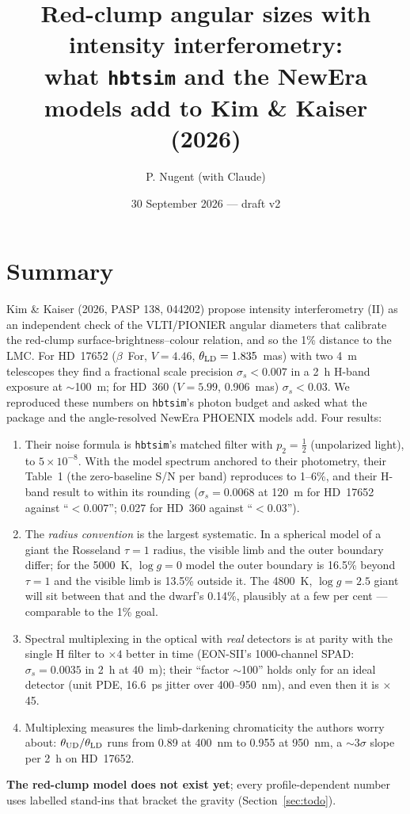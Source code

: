 \documentclass[11pt]{article}
\title{Red-clump angular sizes with intensity interferometry:\\
what \texttt{hbtsim} and the NewEra models add to Kim \& Kaiser (2026)}
\author{P. Nugent (with Claude)}
\date{30 September 2026 --- draft v2}
\begin{document}
\maketitle

\section*{Summary}

Kim \& Kaiser (2026, PASP 138, 044202) propose intensity interferometry
(II) as an independent check of the VLTI/PIONIER angular diameters that
calibrate the red-clump surface-brightness--colour relation, and so
the 1\% distance to the LMC. For HD~17652 ($\beta$~For, $V = 4.46$,
$\theta_{\rm LD} = 1.835$~mas) with two 4~m telescopes they find a
fractional scale precision $\sigma_s < 0.007$ in a 2~h H-band exposure
at $\sim$100~m; for HD~360 ($V = 5.99$, 0.906~mas) $\sigma_s < 0.03$.
We reproduced these numbers on \texttt{hbtsim}'s photon budget and
asked what the package and the angle-resolved NewEra PHOENIX models add.
Four results:
\begin{enumerate}
\item Their noise formula is \texttt{hbtsim}'s matched filter with
  $p_2 = \tfrac12$ (unpolarized light), to $5\times10^{-8}$. With the
  model spectrum anchored to their photometry, their Table~1 (the
  zero-baseline S/N per band) reproduces to 1--6\%, and their H-band
  result to within its rounding ($\sigma_s = 0.0068$ at 120~m for
  HD~17652 against ``$< 0.007$''; 0.027 for HD~360 against ``$< 0.03$'').
\item The \emph{radius convention} is the largest systematic. In a
  spherical model of a giant the Rosseland $\tau = 1$ radius, the
  visible limb and the outer boundary differ; for the 5000~K, $\log g
  = 0$ model the outer boundary is 16.5\% beyond $\tau = 1$ and the
  visible limb is 13.5\% outside it. The 4800~K, $\log g = 2.5$ giant
  will sit between that and the dwarf's 0.14\%, plausibly at a few
  per cent --- comparable to the 1\% goal.
\item Spectral multiplexing in the optical with \emph{real} detectors
  is at parity with the single H filter to $\times4$ better in time
  (EON-SII's 1000-channel SPAD: $\sigma_s = 0.0035$ in 2~h at 40~m);
  their ``factor $\sim$100'' holds only for an ideal detector (unit
  PDE, 16.6~ps jitter over 400--950~nm), and even then it is $\times$45.
\item Multiplexing measures the limb-darkening chromaticity the
  authors worry about: $\theta_{\rm UD}/\theta_{\rm LD}$ runs from
  0.89 at 400~nm to 0.955 at 950~nm, a $\sim$3$\sigma$ slope per 2~h
  on HD~17652.
\end{enumerate}
\textbf{The red-clump model does not exist yet}; every
profile-dependent number uses labelled stand-ins that bracket the
gravity (Section~\ref{sec:todo}).
\end{document}
